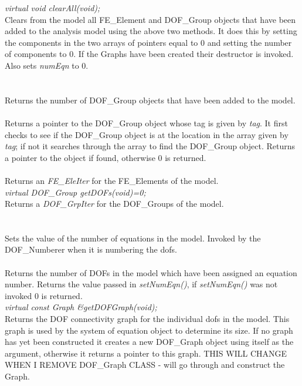 {\em virtual void clearAll(void);} \\
Clears from the model all FE\_Element and DOF\_Group objects that have
been added to the analysis model using the above two methods. It does
this by setting the components in the two arrays of pointers equal to
$0$ and setting the number of components to $0$. If the Graphs have
been created their destructor is invoked. Also sets {\em numEqn} to $0$. \\

  \\
\\
Returns the number of DOF\_Group objects that have been added to the
model.\\

\\
Returns a pointer to the DOF\_Group object whose tag is given by {\em
tag}.  It first checks to see if the DOF\_Group object is at the
location in the array given by {\em tag}; if not it searches through
the array to find the DOF\_Group object. Returns a pointer to the
object if found, otherwise $0$ is returned.\\

 \\
Returns an {\em FE\_EleIter} for the FE\_Elements of the model. \\

{\em virtual DOF\_Group getDOFs(void)=0;} \\
Returns a {\em DOF\_GrpIter} for the DOF\_Groups of the model. \\

  \\
 \\
Sets the value of the number of equations in the model. Invoked by the
DOF\_Numberer when it is numbering the dofs. \\

 \\
Returns the number of DOFs in the model which have been assigned
an equation number. Returns the value passed in {\em setNumEqn()},
if {\em setNumEqn()} was not invoked $0$ is returned.\\

{\em virtual const Graph \&getDOFGraph(void);} \\
Returns the DOF connectivity graph for the individual dofs in the
model. This graph is used by the system of equation object to
determine its size. If no graph has yet been constructed it creates
a new DOF\_Graph object using itself as the argument, otherwise it
returns a pointer to this graph. THIS WILL CHANGE WHEN I REMOVE
DOF\_Graph CLASS - will go through and construct the Graph.\\

